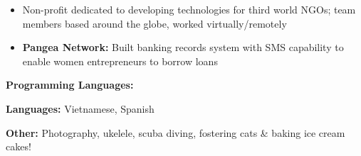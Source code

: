 \documentclass[10pt,a4paper,ragged2e]{altacv}
\begin{document}


\divider \newline
{}
\begin{itemize}
\item {Non-profit dedicated to developing technologies for third world NGOs; team members based around the globe, worked virtually/remotely} \item{\textbf{Pangea Network:} Built banking records system with SMS capability to enable women entrepreneurs to borrow loans}
\end{itemize}



\textbf{Programming Languages:} %
\hspace{-1em}
 \hspace{-2em}  \hspace{-2em} 


\vspace{.5em}
\noindent\textbf{Languages:} Vietnamese, Spanish \smallskip


\noindent\textbf{Other:} Photography, ukelele, scuba diving, fostering cats \& baking ice cream cakes!


\end{document}
